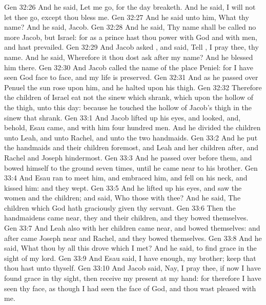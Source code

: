 \vs Gen 32:26 And he said, Let me go, for the day breaketh. And he said, I will not let thee go, except thou bless me.
\vs Gen 32:27 And he said unto him, What  thy name? And he said, Jacob.
\vs Gen 32:28 And he said, Thy name shall be called no more Jacob, but Israel: for as a prince hast thou power with God and with men, and hast prevailed.
\vs Gen 32:29 And Jacob asked , and said, Tell , I pray thee, thy name. And he said, Wherefore  it  thou dost ask after my name? And he blessed him there.
\vs Gen 32:30 And Jacob called the name of the place Peniel: for I have seen God face to face, and my life is preserved.
\vs Gen 32:31 And as he passed over Penuel the sun rose upon him, and he halted upon his thigh.
\vs Gen 32:32 Therefore the children of Israel eat not  the sinew which shrank, which  upon the hollow of the thigh, unto this day: because he touched the hollow of Jacob's thigh in the sinew that shrank.
\vs Gen 33:1 And Jacob lifted up his eyes, and looked, and, behold, Esau came, and with him four hundred men. And he divided the children unto Leah, and unto Rachel, and unto the two handmaids.
\vs Gen 33:2 And he put the handmaids and their children foremost, and Leah and her children after, and Rachel and Joseph hindermost.
\vs Gen 33:3 And he passed over before them, and bowed himself to the ground seven times, until he came near to his brother.
\vs Gen 33:4 And Esau ran to meet him, and embraced him, and fell on his neck, and kissed him: and they wept.
\vs Gen 33:5 And he lifted up his eyes, and saw the women and the children; and said, Who  those with thee? And he said, The children which God hath graciously given thy servant.
\vs Gen 33:6 Then the handmaidens came near, they and their children, and they bowed themselves.
\vs Gen 33:7 And Leah also with her children came near, and bowed themselves: and after came Joseph near and Rachel, and they bowed themselves.
\vs Gen 33:8 And he said, What  thou by all this drove which I met? And he said,  to find grace in the sight of my lord.
\vs Gen 33:9 And Esau said, I have enough, my brother; keep that thou hast unto thyself.
\vs Gen 33:10 And Jacob said, Nay, I pray thee, if now I have found grace in thy sight, then receive my present at my hand: for therefore I have seen thy face, as though I had seen the face of God, and thou wast pleased with me.

